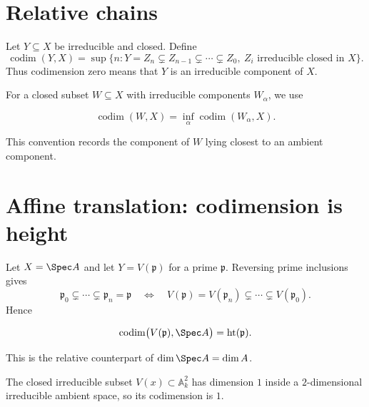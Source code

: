 \section{Relative chains}\label{sec:vi31-relative-chains}
\begin{definition}\label{def:vi31-codim-irreducible}
Let $Y\subseteq X$ be irreducible and closed. Define
\[
\operatorname{codim}(Y,X)=\sup\{n:Y=Z_n\subsetneq Z_{n-1}\subsetneq\cdots\subsetneq Z_0,
\ Z_i\text{ irreducible closed in }X\}.
\]
Thus codimension zero means that $Y$ is an irreducible component of $X$.
\end{definition}
For a closed subset $W\subseteq X$ with irreducible components $W_\alpha$, we use
\begin{definition}\label{def:vi31-codim-closed}
\[
 \operatorname{codim}(W,X)=\inf_\alpha\operatorname{codim}(W_\alpha,X).
\]
\end{definition}
This convention records the component of $W$ lying closest to an ambient component.


\section{Affine translation: codimension is height}\label{sec:vi31-affine-height}
Let $X=\Spec A$ and let $Y=V(\mathfrak p)$ for a prime $\mathfrak p$.  Reversing prime inclusions gives
\[
\mathfrak p_0\subsetneq\cdots\subsetneq\mathfrak p_n=\mathfrak p
\quad\Longleftrightarrow\quad
V(\mathfrak p)=V(\mathfrak p_n)\subsetneq\cdots\subsetneq V(\mathfrak p_0).
\]
Hence
\begin{proposition}\label{prop:vi31-height}
\[
 \operatorname{codim}\bigl(V(\mathfrak p),\Spec A\bigr)=\operatorname{ht}(\mathfrak p).
\]
\end{proposition}
This is the relative counterpart of $\dim\Spec A=\dim A$.


\begin{example}\label{ex:vi31-expand-01}
The closed irreducible subset $V(x)\subset\mathbb A^2_k$ has dimension $1$ inside a $2$-dimensional irreducible ambient space, so its codimension is $1$.
\end{example}
